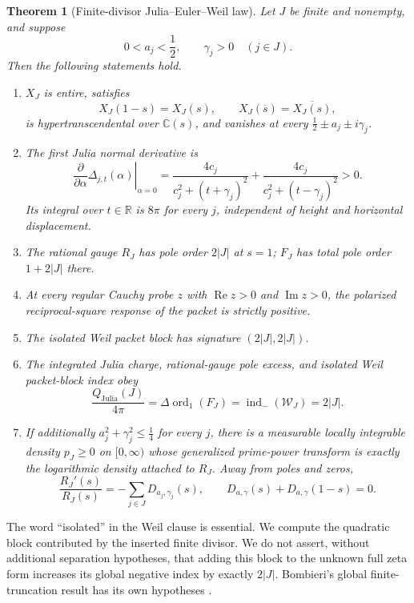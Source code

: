 \documentclass[11pt]{article}
\newtheorem{theorem}{Theorem}[section]
\newcommand{\C}{\mathbb C}
\newcommand{\R}{\mathbb R}
\newcommand{\WW}{\mathcal W}
\newcommand{\ord}{\operatorname{ord}}
\newcommand{\indm}{\operatorname{ind}_{-}}
\newcommand{\re}{\operatorname{Re}}
\newcommand{\im}{\operatorname{Im}}
\begin{document}
\begin{theorem}[Finite-divisor Julia--Euler--Weil law]
\label{thm:main}
Let \(J\) be finite and nonempty, and suppose
\[
 0<a_j<\frac12,\qquad \gamma_j>0
\quad(j\in J).
\]
Then the following statements hold.

\begin{enumerate}
\item \(X_J\) is entire, satisfies
      \[
      X_J(1-s)=X_J(s),\qquad
      X_J(\overline{s})=\overline{X_J(s)},
      \]
      is hypertranscendental over \(\C(s)\), and vanishes at every
      \(\frac12\pm a_j\pm i\gamma_j\).
\item The first Julia normal derivative is
      \[
      \left.\frac{\partial}{\partial\alpha}
        \Delta_{j,t}(\alpha)\right|_{\alpha=0}
      =
      \frac{4c_j}{c_j^2+(t+\gamma_j)^2}
      +\frac{4c_j}{c_j^2+(t-\gamma_j)^2}>0.
      \]
      Its integral over \(t\in\R\) is \(8\pi\) for every \(j\), independent
      of height and horizontal displacement.
\item The rational gauge \(R_J\) has pole order \(2|J|\) at \(s=1\);
      \(F_J\) has total pole order \(1+2|J|\) there.
\item At every regular Cauchy probe \(z\) with
      \(\re z>0\) and \(\im z>0\), the polarized reciprocal-square
      response of the packet is strictly positive.
\item The isolated Weil packet block has signature
      \((2|J|,2|J|)\).
\item The integrated Julia charge, rational-gauge pole excess, and
      isolated Weil
      packet-block index obey
      \[
      \boxed{\quad
      \frac{Q_{\mathrm{Julia}}(J)}{4\pi}
       =\Delta\ord_1(F_J)
       =\indm(\WW_J)
       =2|J|.
      \quad}
      \]
\item If additionally
      \(a_j^2+\gamma_j^2\leq\frac14\) for every \(j\), there is a
      measurable locally integrable density \(p_J\geq0\) on
      \([0,\infty)\) whose generalized prime-power transform is exactly
      the logarithmic density attached to \(R_J\).  Away from poles and
      zeros,
      \[
      \frac{R_J'(s)}{R_J(s)}
      =-\sum_{j\in J}D_{a_j,\gamma_j}(s),
      \qquad
      D_{a,\gamma}(s)+D_{a,\gamma}(1-s)=0.
      \]
\end{enumerate}
\end{theorem}

The word ``isolated'' in the Weil clause is essential.  We compute the
quadratic block contributed by the inserted finite divisor.  We do not
assert, without additional separation hypotheses, that adding this block
to the unknown full zeta form increases its global negative index by
exactly \(2|J|\).  Bombieri's global finite-truncation result has its own
hypotheses \cite{Bombieri2000}.
\end{document}
